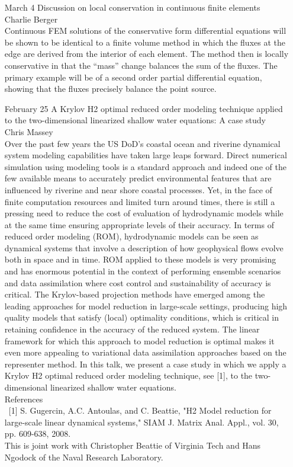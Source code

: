 \documentclass[12]{article}
\begin{document}
\begin{enumerate}
\item[March 4] Discussion on local conservation in continuous finite elements\\ Charlie Berger\\
  Continuous FEM solutions of the conservative form differential equations will be shown to be identical to a finite volume method in which the fluxes at the edge are derived from the interior of each element.  The method then is locally conservative in that the ``mass'' change balances the sum of the fluxes.  The primary example will be of a second order partial differential equation, showing that the fluxes precisely balance the point source.

\item[February 25] A Krylov H2 optimal reduced order modeling technique applied to the two-dimensional linearized shallow water equations: A case study\\Chris Massey\\
  Over the past few years the US DoD's coastal ocean and riverine
dynamical system modeling capabilities
have taken large leaps forward. Direct numerical simulation using
modeling tools is a standard approach
and indeed one of the few available means to accurately predict
environmental features that are influenced
by riverine and near shore coastal processes. Yet, in the face of finite
computation resources and limited turn
around times, there is still a pressing need to reduce the cost of
evaluation of hydrodynamic models while at
the same time ensuring appropriate levels of their accuracy. In terms of
reduced order modeling (ROM),
hydrodynamic models can be seen as dynamical systems that involve a
description of how geophysical
flows evolve both in space and in time. ROM applied to these models is
very promising and has enormous
potential in the context of performing ensemble scenarios and data
assimilation where cost control and
sustainability of accuracy is critical. The Krylov-based projection
methods have emerged among the leading
approaches for model reduction in large-scale settings, producing high
quality models that satisfy (local)
optimality conditions, which is critical in retaining confidence in the
accuracy of the reduced system. The
linear framework for which this approach to model reduction is optimal
makes it even more appealing to
variational data assimilation approaches based on the representer
method.
In this talk, we present a case study in which we apply a Krylov H2
optimal reduced order modeling
technique, see [1], to the two-dimensional linearized shallow water
equations.\\References\\
 \ [1] S. Gugercin, A.C. Antoulas, and C. Beattie, "H2 Model reduction for
large-scale linear dynamical
systems," SIAM J. Matrix Anal. Appl., vol. 30, pp. 609-638, 2008.  \\ This is joint work with Christopher Beattie of Virginia Tech and Hans
Ngodock of the Naval Research Laboratory.


\end{enumerate}
\end{document}
